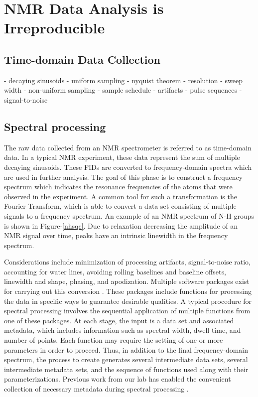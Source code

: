 \chapter{NMR Data Analysis is Irreproducible}

\section{Time-domain Data Collection}
 - decaying sinusoids
 - uniform sampling
 - nyquist theorem
 - resolution
 - sweep width
 - non-uniform sampling
   - sample schedule
 - artifacts
 - pulse sequences
 - signal-to-noise


\section{Spectral processing}

The raw data collected from an NMR spectrometer is referred to as 
time-domain data.  In a typical NMR experiment, these data represent the 
sum of multiple decaying sinusoids.  These FIDs are converted to 
frequency-domain spectra which are used in further analysis.  The goal of 
this phase is to construct a frequency spectrum which indicates the resonance 
frequencies of the atoms that were observed in the experiment.  A common tool 
for such a transformation is the Fourier Transform, which is able to convert 
a data set consisting of multiple signals to a frequency spectrum.  
An example of an NMR spectrum of N-H groups is shown in Figure-\ref{nhsqc}.
Due to relaxation decreasing the amplitude of an NMR signal over time, peaks 
have an intrinsic linewidth in the frequency spectrum.

Considerations include minimization of processing artifacts, signal-to-noise 
ratio, accounting for water lines, avoiding rolling baselines and baseline 
offsets, linewidth and shape, phasing, and apodization.  Multiple software 
packages exist for carrying out this conversion \cite{nmrpipe, rnmrtk}.
These packages include functions for processing the data in specific ways to 
guarantee desirable qualities.  A typical procedure for spectral processing 
involves the sequential application of multiple functions from one of these 
packages.  At each stage, the input is a data set and associated metadata, 
which includes information such as spectral width, dwell time, and number of 
points.  Each function may require the setting of one or more parameters in 
order to proceed.  Thus, in addition to the final frequency-domain spectrum, 
the process to create generates several intermediate data sets, several 
intermediate metadata sets, and the sequence of functions used along with 
their parameterizations.  Previous work from our lab has enabled the 
convenient collection of necessary metadata during spectral 
processing \cite{connjur-wb}.


